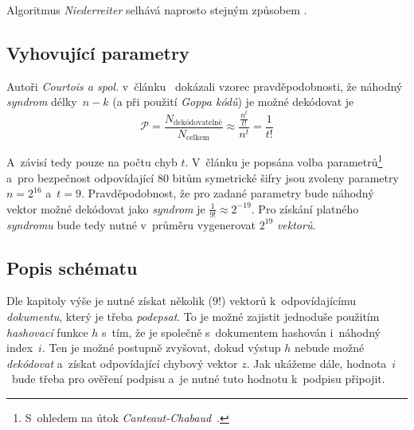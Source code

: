 \documentclass[thesis=M,czech,hidelinks]{FITthesis}[2012/06/26]
\newcommand{\0}{{\textcolor[gray]{0.75}{0}}}
\begin{document}
Algoritmus \emph{Niederreiter} selhává naprosto stejným způsobem
\cite{Courtois}.


\subsection{Vyhovující parametry}

Autoři \emph{Courtois a spol.} v~článku~\cite{Courtois} dokázali vzorec
pravděpodobnosti, že náhodný \emph{syndrom} délky~$n-k$ (a při použití
\emph{Goppa kódů}) je možné dekódovat je
$$
    \mathcal{P} = \frac{N_{\text{dekódovatelné}}}{N_{\text{celkem}}} \approx
    \frac{\frac{n^t}{t!}}{n^t} = \frac{1}{t!}
$$


A~závisí tedy pouze na počtu chyb $t$. V~článku je popsána volba
parametrů\footnote{
    S~ohledem na útok \emph{Canteaut-Chabaud}~\cite{Canteaut}.
} a~pro bezpečnost odpovídající $80$ bitům symetrické šifry jsou zvoleny
parametry $n=2^{16}$ a~$t=9$.  Pravděpodobnost, že pro zadané parametry bude
náhodný vektor možné dekódovat jako \emph{syndrom} je $\frac{1}{9!} \approx
2^{-19}$. Pro získání platného \emph{syndromu} bude tedy nutné v~průměru
vygenerovat $2^{19}$ \emph{vektorů}.


\subsection{Popis schématu}

Dle kapitoly výše je nutné získat několik ($9!$) vektorů k~odpovídajícímu
\emph{dokumentu}, který je třeba \emph{podepsat}. To je možné zajistit jednoduše
použitím \emph{hashovací} funkce $h$ s~tím, že je společně s~dokumentem hashován
i~náhodný index~$i$. Ten je možné postupně zvyšovat, dokud výstup $h$ nebude
možné \emph{dekódovat} a~získat odpovídající chybový vektor $z$. Jak ukážeme
dále, hodnota~$i$~bude třeba pro ověření podpisu a~je nutné tuto hodnotu
k~podpisu připojit.
\end{document}
